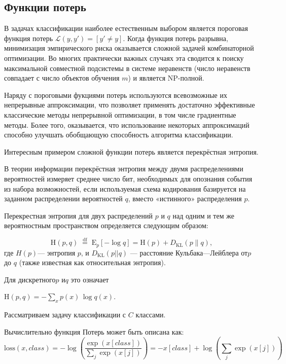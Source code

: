 \subsection*{Функции потерь}

В задачах классификации наиболее естественным выбором является пороговая функция потерь
$ {\mathcal L}(y,y') = [y'\neq y] $.
Когда функция потерь разрывна, минимизация эмпирического риска оказывается сложной задачей комбинаторной оптимизации. Во многих практически важных случаях эта сводится к поиску максимальной совместной подсистемы в системе неравенств (число неравенств совпадает с число объектов обучения $ m $) и является NP-полной.

Наряду с пороговыми фукциями потерь используются всевозможные их непрерывные аппроксимации, что позволяет применять достаточно эффективные классические методы непрерывной оптимизации, в том числе градиентные методы. Более того, оказывается, что использование некоторых аппроксимаций способно улучшать обобщающую способность алгоритма классификации.

Интересным примером сложной функции потерь является перекрёстная энтропия.

В теории информации перекрёстная энтропия между двумя распределениями вероятностей измеряет среднее число бит, необходимых для опознания события из набора возможностей, если используемая схема кодирования базируется на заданном распределении вероятностей $ q $, вместо «истинного» распределения $ p $.

Перекрестная энтропия для двух распределений  $ p $ и $ q $ над одним и тем же вероятностным пространством определяется следующим образом:

$$ {\displaystyle \mathrm {H} (p,q){\stackrel {\mathrm {df} }{\;=\;}}\mathrm {E} _{p}[-\log q]=\mathrm {H} (p)+D_{\mathrm {KL} }(p\|q)},$$
где $ {\displaystyle H(p)}  $— энтропия $ p $, и $ {\displaystyle D_{\mathrm {KL} }(p||q)} $ — расстояние Кульбака—Лейблера от$  {\displaystyle p} $ до $  q $ (также известная как относительная энтропия).

Для дискретного$  {\displaystyle p} $ и$  {\displaystyle q} $ это означает

$ {\displaystyle \mathrm {H} (p,q)=-\sum _{x}p(x)\,\log q(x)} $.

Рассматриваем задачу классификации с $ C $ классами.

Вычислительно функция Потерь может быть описана как:
$$  \text{loss}(x, class) = -\log\left(\frac{\exp(x[class])}{\sum_j \exp(x[j])}\right)
= -x[class] + \log\left(\sum_j \exp(x[j])\right) $$

